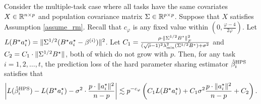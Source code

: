 \begin{theorem}\label{thm_many_tasks}
	Consider the multiple-task case where all tasks have the same covariates $X\in\mathbb{R}^{n\times p}$ and population covariance matrix $\Sigma\in\mathbb{R}^{p\times p}$.
	Suppose that $X$ satisfies Assumption \ref{assume_rm}.
	Recall that $c_{\varphi}$ is any fixed value within $(0, \frac{\varphi-4}{2\varphi})$.
	Let $L(B^{\star}a_i^{\star}) = \|\Sigma^{1/2} (B^{\star} a_i^{\star}- \beta^{(i)})\|^2$.
	Let $C_1 = \frac{\rho\cdot \|\Sigma^{1/2} B^{\star}\|_{_{F}}^2}{(\sqrt{\rho} - 1)^2\lambda_{\min}^2(\Sigma^{1/2} B^{\star}) + \sigma^2}$ and $C_2 =  C_1\cdot \|\Sigma^{1/2} B^{\star}\|$, both of which do not grow with $p$.
	Then, for any task $i = 1, 2, \dots, t$, the prediction loss of the hard parameter sharing estimator $\hat{\beta}_i^{\textup{HPS}}$ satisfies that
	\begin{align}
		{\left| {L(\hat{\beta}_i^{\textup{HPS}}) - L(B^{\star}a_i^{\star}) - \sigma^2  \cdot \frac{p \cdot \|a_i^{\star}\|^2}{n - p}} \right|} \lesssim p^{-c_{\varphi}}\left({C_1 L(B^{\star}a_i^{\star}) + C_1 \sigma^2 \frac{p \cdot{\|a_i^{\star}\|^2}}{n-p} + C_2}\right). \label{eq_thm_many}
	\end{align}
\end{theorem}

